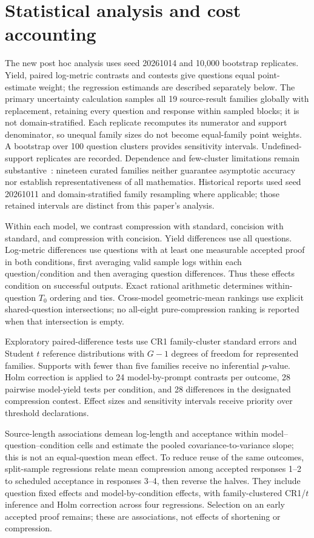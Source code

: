 \documentclass[11pt]{article}
\begin{document}
\section{Statistical analysis and cost accounting}
\label{sec:methods-statistics}

The new post hoc analysis uses seed 20261014 and 10,000 bootstrap replicates. Yield, paired log-metric contrasts and contests give questions equal point-estimate weight; the regression estimands are described separately below. The primary uncertainty calculation samples all 19 source-result families globally with replacement, retaining every question and response within sampled blocks; it is not domain-stratified. Each replicate recomputes its numerator and support denominator, so unequal family sizes do not become equal-family point weights. A bootstrap over 100 question clusters provides sensitivity intervals. Undefined-support replicates are recorded. Dependence and few-cluster limitations remain substantive~\cite{cluster}: nineteen curated families neither guarantee asymptotic accuracy nor establish representativeness of all mathematics. Historical reports used seed 20261011 and domain-stratified family resampling where applicable; those retained intervals are distinct from this paper's analysis.

Within each model, we contrast compression with standard, concision with standard, and compression with concision. Yield differences use all questions. Log-metric differences use questions with at least one measurable accepted proof in both conditions, first averaging valid sample logs within each question/condition and then averaging question differences. Thus these effects condition on successful outputs. Exact rational arithmetic determines within-question $T_0$ ordering and ties. Cross-model geometric-mean rankings use explicit shared-question intersections; no all-eight pure-compression ranking is reported when that intersection is empty.

Exploratory paired-difference tests use CR1 family-cluster standard errors and Student $t$ reference distributions with $G-1$ degrees of freedom for represented families. Supports with fewer than five families receive no inferential $p$-value. Holm correction is applied to 24 model-by-prompt contrasts per outcome, 28 pairwise model-yield tests per condition, and 28 differences in the designated compression contest. Effect sizes and sensitivity intervals receive priority over threshold declarations.

Source-length associations demean log-length and acceptance within model--question--condition cells and estimate the pooled covariance-to-variance slope; this is not an equal-question mean effect. To reduce reuse of the same outcomes, split-sample regressions relate mean compression among accepted responses 1--2 to scheduled acceptance in responses 3--4, then reverse the halves. They include question fixed effects and model-by-condition effects, with family-clustered CR1/$t$ inference and Holm correction across four regressions. Selection on an early accepted proof remains; these are associations, not effects of shortening or compression.
\end{document}

